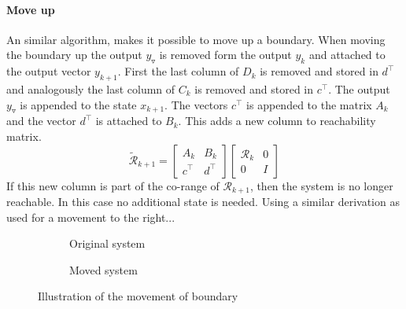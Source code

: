\documentclass[doctype=mastersthesis,BCOR=15mm,biblatex]{ldvbook}%
\newcommand{\R}{\mathcal{R}} %
\newcommand{\eye}{I} %
\newcommand{\m}{\triangledown} %
\begin{document}
\paragraph{Move up}
An similar algorithm, makes it possible to move up a boundary.
When moving the boundary up the output $y_\m$ is removed form the output $y_k$ and attached to the output vector $y_{k+1}$.
First the last column of $D_{k}$ is removed and stored in $d^\top$ and analogously the last column of $C_k$ is removed and stored in $c^\top$.
The output $y_\m$ is appended to the state $x_{k+1}$.
The vectors $c^\top$ is appended to the matrix $A_k$ and the vector $d^\top$ is attached to $B_k$.
This adds a new column to reachability matrix.
\begin{equation}
\tilde{\R}_{k+1}
=
\begin{bmatrix}
A_{k} & B_{k}\\
c^\top & d^\top
\end{bmatrix}
\begin{bmatrix}
\R_{k} &0\\
0& \eye
\end{bmatrix}
\end{equation}
If this new column is part of the co-range of $\R_{k+1}$, then the system is no longer reachable.
In this case no additional state is needed. 
Using a similar derivation as used for a movement to the right...


\begin{figure}[htb]
	\centering
	
	\begin{subfigure}[b]{0.45\textwidth}
		\caption{Original system}
		\label{fig:move_up_a}
	\end{subfigure}
	\hspace{0.8cm}
	\begin{subfigure}[b]{0.45\textwidth}
		\caption{Moved system}
		\label{fig:move_up_b}
	\end{subfigure}
	\caption{Illustration of the movement of boundary}
	\label{fig:move_up}
\end{figure}
\end{document}
